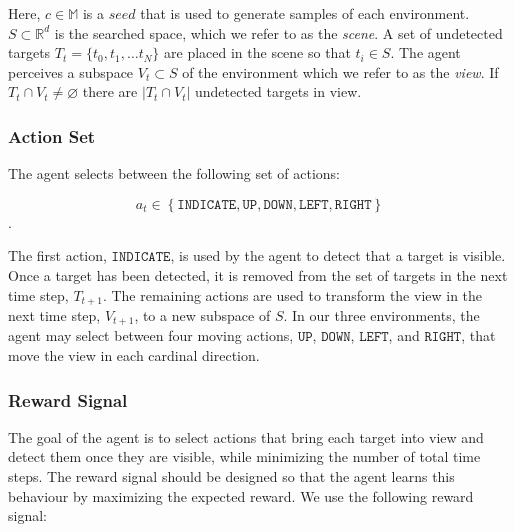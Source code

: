 Here, \(c \in \mathbb{M}\) is a \(seed\) that is used to generate samples of each environment.
\(S \subset \mathbb{R}^d\) is the searched space, which we refer to as the \textit{scene}.
A set of undetected targets \(T_t = \{t_0, t_1, \dots t_N\}\) are placed in the scene so that \(t_i \in S\).
The agent perceives a subspace \(V_t \subset S\) of the environment which we refer to as the \textit{view}.
If \(T_t \cap V_t \neq \varnothing\) there are \(\left\lvert T_t \cap V_t \right\rvert\) undetected targets in view.




\subsubsection{Action Set}

The agent selects between the following set of actions:

\begin{equation}
    a_t \in \left\lbrace \mathtt{INDICATE}, \mathtt{UP}, \mathtt{DOWN}, \mathtt{LEFT}, \mathtt{RIGHT} \right\rbrace
\end{equation}.

The first action, \(\mathtt{INDICATE}\), is used by the agent to detect that a target is visible.
Once a target has been detected, it is removed from the set of targets in the next time step, \(T_{t+1}\).
The remaining actions are used to transform the view in the next time step, \(V_{t+1}\), to a new subspace of \(S\).
In our three environments, the agent may select between four moving actions, \(\mathtt{UP}\), \(\mathtt{DOWN}\), \(\mathtt{LEFT}\), and \(\mathtt{RIGHT}\), that move the view in each cardinal direction.

\subsubsection{Reward Signal}

The goal of the agent is to select actions that bring each target into view and detect them once they are visible, while minimizing the number of total time steps.
The reward signal should be designed so that the agent learns this behaviour by maximizing the expected reward.
We use the following reward signal:

